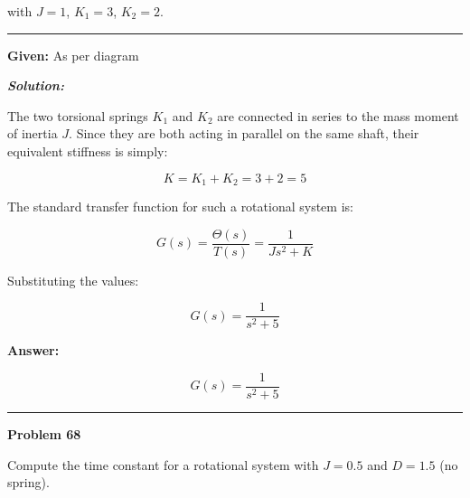 \documentclass[11pt,letterpaper]{article}
\begin{document}
\bigskip
with $J=1$, $K_1=3$, $K_2=2$.

\noindent\rule{\textwidth}{0.4pt}


\noindent\textbf{Given:} As per diagram

\vspace{12pt}
\noindent\textit{\textbf{Solution:}}

\vspace{12pt}


\bigskip
The two torsional springs $K_1$ and $K_2$ are connected in series to the mass moment of inertia $J$. Since they are both acting in parallel on the same shaft, their equivalent stiffness is simply:

\bigskip
\[
K = K_1 + K_2 = 3 + 2 = 5
\]

\bigskip
The standard transfer function for such a rotational system is:

\bigskip
\[
G(s) = \frac{\Theta(s)}{T(s)} = \frac{1}{Js^2 + K}
\]

\bigskip
Substituting the values:

\bigskip
\[
G(s) = \frac{1}{s^2 + 5}
\]

\bigskip
\textbf{Answer:}

\bigskip
\[
\boxed{G(s) = \frac{1}{s^2 + 5}}
\]

\clearpage
\noindent\rule{\textwidth}{0.4pt}
\textbf{Problem 68}

Compute the time constant for a rotational system with $J=0.5$ and $D=1.5$ (no spring).

\begin{center}
\end{center}
\end{document}
